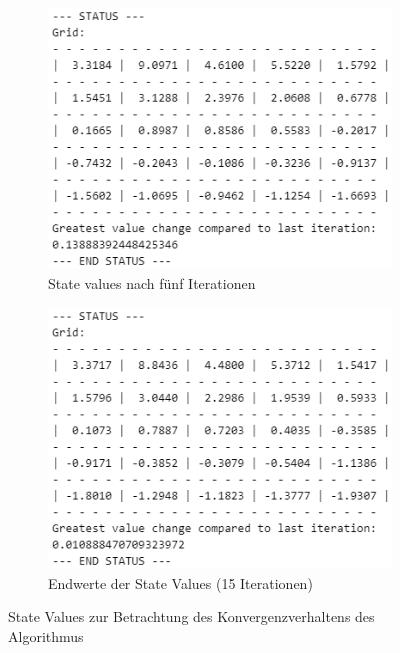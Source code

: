 \documentclass[11pt]{article}
\begin{document}
\begin{figure}
\begin{subfigure}[b]{0.49\textwidth}
        \centering
        \includegraphics[width=\textwidth]{img/img_2_1_a_it5.png}
        \caption{State values nach fünf Iterationen}
        \label{img:2_1_a2_it5}
    \end{subfigure}
    \hfill
    \begin{subfigure}[b]{0.49\textwidth}
        \centering
        \includegraphics[width=\textwidth]{img/img_2_1_a_it_final.png}
        \caption{Endwerte der State Values (15 Iterationen)}
        \label{img:2_1_a2_it15}
    \end{subfigure}
    \caption{State Values zur Betrachtung des Konvergenzverhaltens des Algorithmus}
    \label{img:2_1_a2}
\end{figure}
\end{document}
